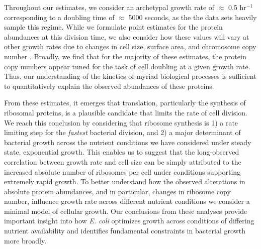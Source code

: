 Throughout our estimates, we consider an archetypal growth rate of $\approx$ 0.5
hr$^{-1}$ corresponding to a doubling time of $\approx$ 5000 seconds, as the the
data sets heavily sample this regime. While we formulate point estimates for the
protein abundances at this division time, we also consider how these values will vary
at other growth rates due to changes in cell size, surface area, and chromosome
copy number \citep{taheriaraghi2015}. Broadly, we find that for the majority of
these estimates, the protein copy numbers appear tuned for the task of cell
doubling at a given growth rate. Thus, our understanding of the kinetics of
myriad biological processes is sufficient to quantitatively explain the
observed abundances of these proteins.

From these estimates, it emerges that translation, particularly the synthesis of
ribosomal proteins, is a plausible candidate that limits the rate of cell
division. We reach this conclusion by considering that ribosome synthesis is 1)
a rate limiting step for the \textit{fastest} bacterial division, and 2) a major
determinant of bacterial growth across the nutrient conditions we have
considered under steady state, exponential growth. This enables us to suggest
that the long-observed correlation between growth rate and cell size
\citep{schaechter1958, si2017} can be simply attributed to the increased
absolute number of ribosomes per cell under conditions supporting extremely
rapid growth. To better understand how the observed alterations in absolute
protein abundances, and in particular, changes in ribosome copy number,
influence growth rate across different nutrient conditions we consider a minimal
model of cellular growth. Our conclusions from these analyses provide important
insight into how \textit{E. coli} optimizes growth across conditions of
differing nutrient availability and identifies fundamental constraints in
bacterial growth more broadly.



